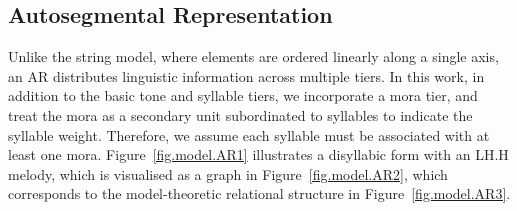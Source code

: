 \subsection{Autosegmental Representation}
\label{sec:prelim.ar}

Unlike the string model, where elements are ordered linearly along a
single axis, an AR distributes linguistic information
across multiple tiers. In this work, in addition to the basic tone and
syllable tiers, we incorporate a mora tier, 
and treat the mora as a secondary unit subordinated
to syllables to indicate the syllable weight. Therefore,
we assume each syllable must be associated with at least one
mora. %
Figure~\ref{fig.model.AR1} illustrates a disyllabic form with an
LH.H melody, which is visualised as a graph in 
Figure~\ref{fig.model.AR2}, which corresponds to the model-theoretic 
relational structure in Figure~\ref{fig.model.AR3}.


